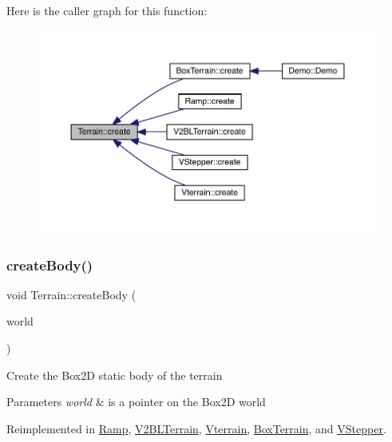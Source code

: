 Here is the caller graph for this function\+:\nopagebreak
\begin{figure}[H]
\begin{center}
\leavevmode
\includegraphics[width=350pt]{class_terrain_ae7515dee9afa3b1cefac459abefb5442_icgraph}
\end{center}
\end{figure}
\mbox{\label{class_terrain_a97e007277f8abb9dde20ef2b49c38a3a}} 
\subsubsection{\texorpdfstring{create\+Body()}{createBody()}}
{\footnotesize\ttfamily void Terrain\+::create\+Body (\begin{DoxyParamCaption}\item[{b2\+World $\ast$}]{world }\end{DoxyParamCaption})\hspace{0.3cm}{\ttfamily [virtual]}}

Create the Box2D static body of the terrain 
\begin{DoxyParams}{Parameters}
{\em world} & is a pointer on the Box2D world \\
\hline
\end{DoxyParams}


Reimplemented in \mbox{\hyperlink{class_ramp_a12049389b07cc2bff4932004c8357dd2}{Ramp}}, \mbox{\hyperlink{class_v2_b_l_terrain_a51b40b5e3f6ee5ec1281baa7f7c076f9}{V2\+B\+L\+Terrain}}, \mbox{\hyperlink{class_vterrain_a5c46826f82f94442e3a2fb8f277bfb37}{Vterrain}}, \mbox{\hyperlink{class_box_terrain_a7f5172beaa4e5dcb4d45f3c5e46e3155}{Box\+Terrain}}, and \mbox{\hyperlink{class_v_stepper_a3d7c63308277488473edf5326491d7ee}{V\+Stepper}}.

